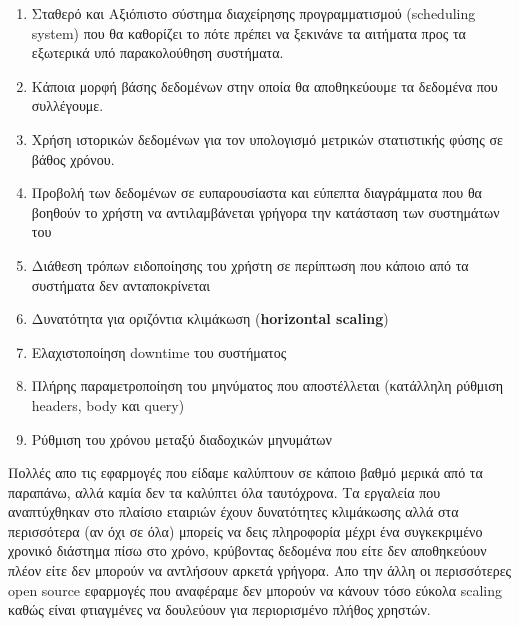 \begin{enumerate}
	\item Σταθερό και Αξιόπιστο σύστημα διαχείρησης προγραμματισμού (scheduling system) που θα
		καθορίζει το πότε πρέπει να ξεκινάνε τα αιτήματα προς τα εξωτερικά υπό παρακολούθηση συστήματα.
	\item Κάποια μορφή βάσης δεδομένων στην οποία θα αποθηκεύουμε τα δεδομένα που συλλέγουμε.
	\item Χρήση ιστορικών δεδομένων για τον υπολογισμό μετρικών στατιστικής φύσης σε βάθος χρόνου.
	\item Προβολή των δεδομένων σε ευπαρουσίαστα και εύπεπτα διαγράμματα που θα βοηθούν το χρήστη να αντιλαμβάνεται
		γρήγορα την κατάσταση των συστημάτων του
	\item Διάθεση τρόπων ειδοποίησης του χρήστη σε περίπτωση που κάποιο από τα συστήματα δεν ανταποκρίνεται
	\item Δυνατότητα για οριζόντια κλιμάκωση (\textbf{horizontal scaling})
	\item Ελαχιστοποίηση downtime του συστήματος 
	\item Πλήρης παραμετροποίηση του μηνύματος που αποστέλλεται (κατάλληλη ρύθμιση headers, body και query)
	\item Ρύθμιση του χρόνου μεταξύ διαδοχικών μηνυμάτων
\end{enumerate}

Πολλές απο τις εφαρμογές που είδαμε καλύπτουν σε κάποιο βαθμό μερικά από τα παραπάνω, αλλά καμία
δεν τα καλύπτει όλα ταυτόχρονα. Τα εργαλεία που αναπτύχθηκαν στο πλαίσιο εταιριών έχουν δυνατότητες κλιμάκωσης
αλλά στα περισσότερα (αν όχι σε όλα) μπορείς να δεις πληροφορία μέχρι ένα συγκεκριμένο χρονικό διάστημα πίσω στο χρόνο,
κρύβοντας δεδομένα που είτε δεν αποθηκεύουν πλέον είτε δεν μπορούν να αντλήσουν αρκετά γρήγορα.
Απο την άλλη οι περισσότερες open source εφαρμογές που αναφέραμε δεν μπορούν να κάνουν τόσο εύκολα scaling
καθώς είναι φτιαγμένες να δουλεύουν για περιορισμένο πλήθος χρηστών. 

